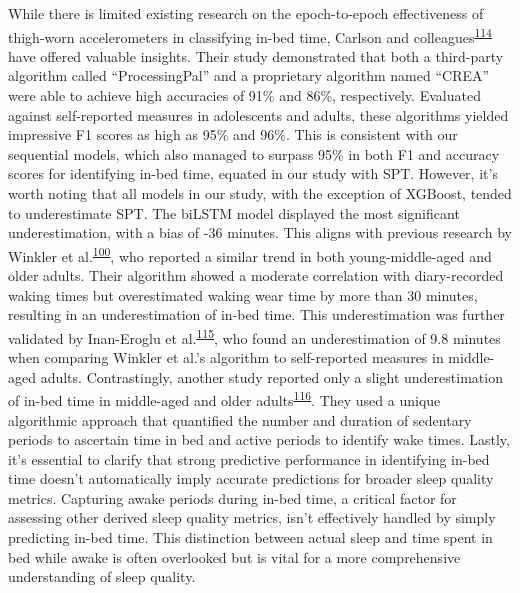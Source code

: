 \documentclass[
  10pt,
]{scrbook}
\begin{document}
While there is limited existing research on the epoch-to-epoch
effectiveness of thigh-worn accelerometers in classifying in-bed time,
Carlson and
colleagues\textsuperscript{\protect\hyperlink{ref-carlson_validity_2021}{114}}
have offered valuable insights. Their study demonstrated that both a
third-party algorithm called ``ProcessingPal'' and a proprietary
algorithm named ``CREA'' were able to achieve high accuracies of 91\%
and 86\%, respectively. Evaluated against self-reported measures in
adolescents and adults, these algorithms yielded impressive F1 scores as
high as 95\% and 96\%. This is consistent with our sequential models,
which also managed to surpass 95\% in both F1 and accuracy scores for
identifying in-bed time, equated in our study with SPT. However, it's
worth noting that all models in our study, with the exception of
XGBoost, tended to underestimate SPT. The biLSTM model displayed the
most significant underestimation, with a bias of -36 minutes. This
aligns with previous research by Winkler et
al.\textsuperscript{\protect\hyperlink{ref-winkler_identifying_2016}{100}},
who reported a similar trend in both young-middle-aged and older adults.
Their algorithm showed a moderate correlation with diary-recorded waking
times but overestimated waking wear time by more than 30 minutes,
resulting in an underestimation of in-bed time. This underestimation was
further validated by Inan-Eroglu et
al.\textsuperscript{\protect\hyperlink{ref-inan-eroglu_comparison_2021}{115}},
who found an underestimation of 9.8 minutes when comparing Winkler et
al.'s algorithm to self-reported measures in middle-aged adults.
Contrastingly, another study reported only a slight underestimation of
in-bed time in middle-aged and older
adults\textsuperscript{\protect\hyperlink{ref-van_der_berg_identifying_2016}{116}}.
They used a unique algorithmic approach that quantified the number and
duration of sedentary periods to ascertain time in bed and active
periods to identify wake times. Lastly, it's essential to clarify that
strong predictive performance in identifying in-bed time doesn't
automatically imply accurate predictions for broader sleep quality
metrics. Capturing awake periods during in-bed time, a critical factor
for assessing other derived sleep quality metrics, isn't effectively
handled by simply predicting in-bed time. This distinction between
actual sleep and time spent in bed while awake is often overlooked but
is vital for a more comprehensive understanding of sleep quality.
\end{document}
